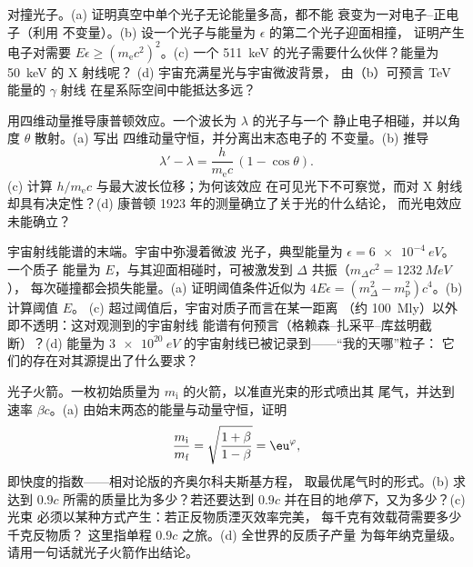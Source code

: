 \begin{exercise}[$\star\star$]\label{exo:b3:relativistic-dynamics:9}
对撞光子。(a) 证明真空中单个光子无论能量多高，都不能
衰变为一对电子–正电子（利用
不变量）。(b) 设一个光子与能量为 $\epsilon$ 的第二个光子迎面相撞，
证明产生电子对需要 $E\epsilon \ge (m_{\text{e}}c^2)^2$。(c) 一个
\qty{511}{keV} 的光子需要什么伙伴？能量为 \qty{50}{keV} 的 X 射线呢？
(d) 宇宙充满星光与宇宙微波背景，
由（b）可预言 TeV 能量的 $\gamma$ 射线
在星系际空间中能抵达多远？
\end{exercise}

\begin{exercise}[$\star\star\star$]\label{exo:b3:relativistic-dynamics:10}
用四维动量推导康普顿效应。一个波长为 $\lambda$ 的光子与一个
静止电子相碰，并以角度 $\theta$ 散射。(a) 写出
四维动量守恒，并分离出末态电子的
不变量。(b) 推导
\[
\lambda' - \lambda = \frac{h}{m_{\text{e}}c}\,(1 - \cos\theta) .
\]
(c) 计算 $h/m_{\text{e}}c$ 与最大波长位移；为何该效应
在可见光下不可察觉，而对 X 射线却具有决定性？(d)
康普顿 1923 年的测量确立了关于光的什么结论，
而光电效应未能确立？
\end{exercise}

\begin{exercise}[$\star\star\star$]\label{exo:b3:relativistic-dynamics:11}
宇宙射线能谱的末端。宇宙中弥漫着微波
光子，典型能量为 $\epsilon = \qty{6e-4}{eV}$。一个质子
能量为 $E$，与其迎面相碰时，可被激发到
$\Delta$ 共振（$m_\Delta c^2 = \qty{1232}{MeV}$），
每次碰撞都会损失能量。(a) 证明阈值条件近似为 $4E\epsilon =
(m_\Delta^2 - m_{\text{p}}^2)c^4$。(b) 计算阈值 $E$。
(c) 超过阈值后，宇宙对质子而言在某一距离
（约 \qty{100}{Mly}）以外即不透明：这对观测到的宇宙射线
能谱有何预言（格赖森–扎采平–库兹明截断）？(d) 能量为
$\qty{3e20}{eV}$ 的宇宙射线已被记录到——“我的天哪”粒子：
它们的存在对其源提出了什么要求？
\end{exercise}

\begin{exercise}[$\star\star\star$]\label{exo:b3:relativistic-dynamics:12}
光子火箭。一枚初始质量为 $m_{\text{i}}$ 的火箭，以准直光束的形式喷出其
尾气，并达到速率 $\beta c$。(a)
由始末两态的能量与动量守恒，证明
\[
\frac{m_{\text{i}}}{m_{\text{f}}} =
\sqrt{\frac{1 + \beta}{1 - \beta}} = \eu^{\varphi} ,
\]
即快度的指数——相对论版的齐奥尔科夫斯基方程，
取最优尾气时的形式。(b) 求
达到 $0.9c$ 所需的质量比为多少？若还要达到 $0.9c$ 并在目的地\emph{停下}，又为多少？(c) 光束
必须以某种方式产生：若正反物质湮灭效率完美，
每千克有效载荷需要多少千克反物质？
这里指单程 $0.9c$ 之旅。(d) 全世界的反质子产量
为每年纳克量级。请用一句话就光子火箭作出结论。
\end{exercise}

